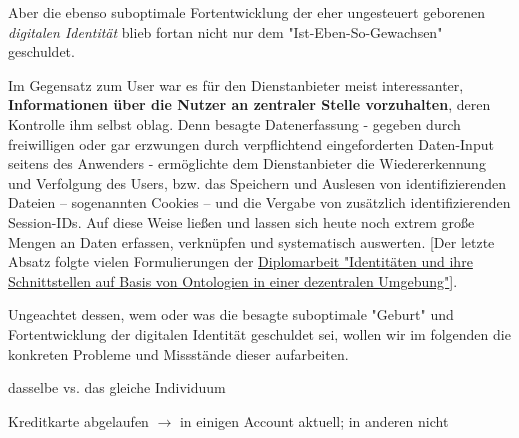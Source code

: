 \vspace{0.3cm}

Aber die ebenso suboptimale Fortentwicklung der eher ungesteuert geborenen \textit{digitalen Identität} blieb fortan nicht nur dem "Ist-Eben-So-Gewachsen" geschuldet.

Im Gegensatz zum User war es für den Dienstanbieter meist interessanter, \textbf{Informationen über die Nutzer an zentraler Stelle vorzuhalten}, deren Kontrolle ihm selbst oblag. Denn besagte Datenerfassung - gegeben durch freiwilligen oder gar erzwungen durch verpflichtend eingeforderten Daten-Input seitens des Anwenders - ermöglichte dem Dienstanbieter die Wiedererkennung und Verfolgung des Users, bzw. das Speichern und Auslesen von identifizierenden Dateien – sogenannten Cookies – und die Vergabe von zusätzlich identifizierenden Session-IDs. Auf diese Weise ließen und lassen sich heute noch extrem große Mengen an Daten erfassen, verknüpfen und systematisch auswerten. [Der letzte Absatz folgte vielen Formulierungen der \href{https://vsis-www.informatik.uni-hamburg.de/getDoc.php/thesis/47/DA_Gordian_Kaulbarsch.pdf}{Diplomarbeit "Identitäten und ihre Schnittstellen auf Basis von Ontologien in einer dezentralen Umgebung"}].

\vspace{0.3cm}

Ungeachtet dessen, wem oder was die besagte suboptimale "Geburt" und Fortentwicklung der digitalen Identität geschuldet sei, wollen wir im folgenden die konkreten Probleme und Missstände dieser aufarbeiten.

\vspace{0.3cm}

\begin{Problem}

dasselbe vs. das gleiche Individuum

\end{Problem}

\vspace{0.3cm}


\begin{Problem}

Kreditkarte abgelaufen $\rightarrow$ in einigen Account aktuell; in anderen nicht

\end{Problem}

\vspace{0.3cm}


